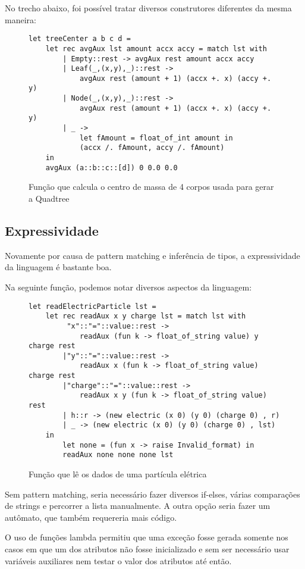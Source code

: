 \documentclass[a4paper,10pt]{article}
\begin{document}
		No trecho abaixo, foi possível tratar diversos construtores diferentes da mesma maneira:
		\begin{figure}[H]
		\centering	
		\begin{lstlisting}
let treeCenter a b c d =
	let rec avgAux lst amount accx accy = match lst with
		| Empty::rest -> avgAux rest amount accx accy
		| Leaf(_,(x,y),_)::rest ->
			avgAux rest (amount + 1) (accx +. x) (accy +. y)
		| Node(_,(x,y),_)::rest ->
			avgAux rest (amount + 1) (accx +. x) (accy +. y)
		| _ ->
			let fAmount = float_of_int amount in
			(accx /. fAmount, accy /. fAmount)
	in
	avgAux (a::b::c::[d]) 0 0.0 0.0
		\end{lstlisting}
		\caption{Função que calcula o centro de massa de 4 corpos usada para gerar a Quadtree}
\end{figure}
		
	\subsection{Expressividade}
		Novamente por causa de pattern matching e inferência de tipos, a expressividade da linguagem é bastante boa.
		
		Na seguinte função, podemos notar diversos aspectos da linguagem:
		\begin{figure}[H]
\begin{lstlisting}
let readElectricParticle lst =
	let rec readAux x y charge lst = match lst with
		 "x"::"="::value::rest -> 
			readAux (fun k -> float_of_string value) y charge rest
		|"y"::"="::value::rest -> 
			readAux x (fun k -> float_of_string value) charge rest
		|"charge"::"="::value::rest ->
			readAux x y (fun k -> float_of_string value) rest
		| h::r -> (new electric (x 0) (y 0) (charge 0) , r)
		| _ -> (new electric (x 0) (y 0) (charge 0) , lst)
	in
		let none = (fun x -> raise Invalid_format) in
		readAux none none none lst
	\end{lstlisting}
		\caption{Função que lê os dados de uma partícula elétrica}
		\label{readElectricParticle}
		\end{figure}
		
		Sem pattern matching, seria necessário fazer diversos if-elses, várias comparações de strings e percorrer a lista manualmente. A outra opção seria fazer um autômato, que também requereria mais código.
		
		O uso de funções lambda permitiu que uma exceção fosse gerada somente nos casos em que um dos atributos não fosse inicializado e sem ser necessário usar variáveis auxiliares nem testar o valor dos atributos até então.
		
\end{document}
